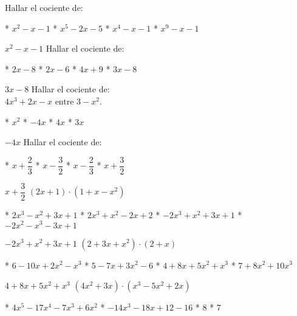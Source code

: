 Hallar el cociente de:
\begin{figure}[h]
\end{figure}
\begin{enum}
  * $x^2-x-1$
  * $x^5-2x-5$
  * $x^4-x-1$
  * $x^9-x-1$
\end{enum}
$x^2-x-1$
Hallar el cociente de:
\begin{figure}[h]
\end{figure}
\begin{enum}
  * $2x-8$
  * $2x-6$
  * $4x+9$
  * $3x-8$
\end{enum}
$3x-8$
Hallar el cociente de: \\
$4x^3+2x-x$ entre $3-x^2$.
\begin{enum}
  * $x^2$
  * $-4x$
  * $4x$
  * $3x$
\end{enum}
$-4x$
Hallar el cociente de:
\begin{figure}[h]
\end{figure}
\begin{enum}
  * $x+\dfrac{2}{3}$
  * $x-\dfrac{3}{2}$
  * $x-\dfrac{2}{3}$
  * $x+\dfrac{3}{2}$
\end{enum}
$x+\dfrac{3}{2}$
$(2x+1)\cdot\left(1+x-x^2\right)$
\begin{enum}
  * $2x^3-x^2+3x+1$
  * $2x^3+x^2-2x+2$
  * $-2x^3+x^2+3x+1$
  * $-2x^2-x^3-3x+1$
\end{enum}
$-2x^3+x^2+3x+1$
$\left(2+3x+x^2\right)\cdot(2+x)$
\begin{enum}
  * $6-10x+2x^2-x^3$
  * $5-7x+3x^2-6$
  * $4+8x+5x^2+x^3$
  * $7+8x^2+10x^3$
\end{enum}
$4+8x+5x^2+x^3$
$\left(4x^2+3x\right)\cdot\left(x^3-5x^2+2x\right)$
\begin{enum}
  * $4x^5-17x^4-7x^3+6x^2$
  * $-14x^3-18x+12-16$
  * $8$
  * $7$
\end{enum}
